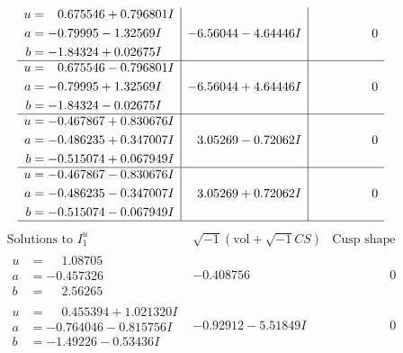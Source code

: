 \documentclass[1p]{elsarticle_modified}
\theoremstyle{definition}
\newcommand{\I}{\sqrt{-1}}
\begin{document}
$$\begin{array}{c|c|c}
\begin{aligned}
u &= \phantom{-}0.675546 + 0.796801 I \\
a &= -0.79995 - 1.32569 I \\
b &= -1.84324 + 0.02675 I\end{aligned}
 & -6.56044 - 4.64446 I & \phantom{-0.000000 } 0 \\ \hline\begin{aligned}
u &= \phantom{-}0.675546 - 0.796801 I \\
a &= -0.79995 + 1.32569 I \\
b &= -1.84324 - 0.02675 I\end{aligned}
 & -6.56044 + 4.64446 I & \phantom{-0.000000 } 0 \\ \hline\begin{aligned}
u &= -0.467867 + 0.830676 I \\
a &= -0.486235 + 0.347007 I \\
b &= -0.515074 + 0.067949 I\end{aligned}
 & \phantom{-}3.05269 - 0.72062 I & \phantom{-0.000000 } 0 \\ \hline\begin{aligned}
u &= -0.467867 - 0.830676 I \\
a &= -0.486235 - 0.347007 I \\
b &= -0.515074 - 0.067949 I\end{aligned}
 & \phantom{-}3.05269 + 0.72062 I & \phantom{-0.000000 } 0\\
 \hline 
 \end{array}$$\newpage$$\begin{array}{c|c|c}  
\text{Solutions to }I^u_{1}& \I (\text{vol} + \sqrt{-1}CS) & \text{Cusp shape}\\
 \hline 
\begin{aligned}
u &= \phantom{-}1.08705\phantom{ +0.000000I} \\
a &= -0.457326\phantom{ +0.000000I} \\
b &= \phantom{-}2.56265\phantom{ +0.000000I}\end{aligned}
 & -0.408756\phantom{ +0.000000I} & \phantom{-0.000000 } 0 \\ \hline\begin{aligned}
u &= \phantom{-}0.455394 + 1.021320 I \\
a &= -0.764046 - 0.815756 I \\
b &= -1.49226 - 0.53436 I\end{aligned}
 & -0.92912 - 5.51849 I & \phantom{-0.000000 } 0 \\ \hline\begin{aligned}

\end{aligned}
\end{array}$$
\end{document}
